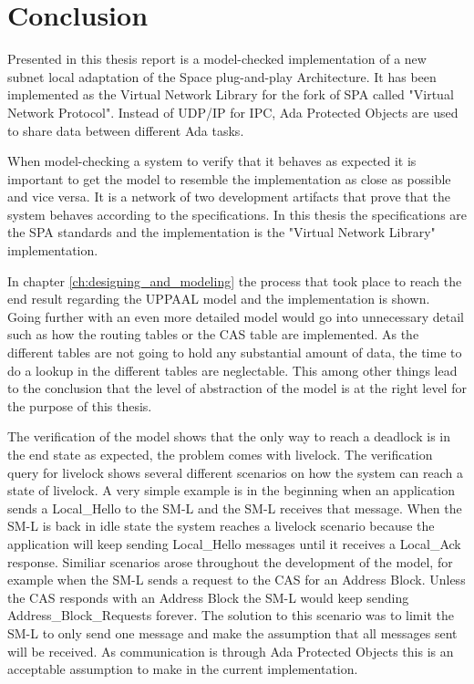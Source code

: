 \chapter{Conclusion}\label{ch:conclusion}
Presented in this thesis report is a model-checked implementation of a new
subnet local adaptation of the Space plug-and-play Architecture. It has been
implemented as the Virtual Network Library \cite{web:github-vn-lib} for the
fork of SPA called "Virtual Network Protocol". Instead of UDP/IP for IPC, Ada
Protected Objects are used to share data between different Ada tasks.

When model-checking a system to verify that it behaves as expected it is
important to get the model to resemble the implementation as close as possible
and vice versa. It is a network of two development artifacts that prove that the
system behaves according to the specifications. In this thesis the
specifications are the SPA standards and the implementation is the "Virtual
Network Library" implementation.

In chapter \ref{ch:designing_and_modeling} the process that took place to reach
the end result regarding the UPPAAL model and the implementation is
shown. Going further with an even more detailed model would go into
unnecessary detail such as how the routing tables or the CAS table are
implemented. As the different tables are not going to hold any substantial
amount of data, the time to do a lookup in the different tables are
neglectable. This among other things lead to the conclusion that the level of
abstraction of the model is at the right level for the purpose of this thesis.

The verification of the model shows that the only way to reach a deadlock is in
the end state as expected, the problem comes with livelock. The
verification query for livelock shows several different scenarios on how the
system can reach a state of livelock. A very simple example is in the beginning
when an application sends a Local\_Hello to the SM-L and the SM-L receives that
message. When the SM-L is back in idle state the system reaches a livelock
scenario because the application will keep sending Local\_Hello messages
until it receives a Local\_Ack response. Similiar scenarios arose throughout
the development of the model, for example when the SM-L sends a request to
the CAS for an Address Block. Unless the CAS responds with an Address Block the
SM-L would keep sending Address\_Block\_Requests forever. The solution to this
scenario was to limit the SM-L to only send one message and make the
assumption that all messages sent will be received. As communication is through
Ada Protected Objects this is an acceptable assumption to make in the current
implementation.

